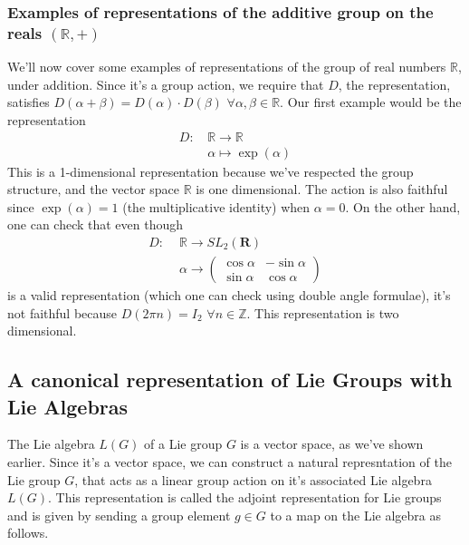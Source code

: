 \documentclass[11pt, oneside]{article}   	%
\theoremstyle{slanted}
\begin{document}
\subsubsection{ Examples of representations of the additive group on the reals $\left( \mathbb{R}, + \right) $} 
We'll now cover some examples of representations of the group of real numbers $\mathbb{R}$, under addition. Since it's a group action, we require that $D$, the representation, satisfies $D( \alpha + \beta ) = D( \alpha) \cdot D( \beta ) \,\, \forall \alpha, \beta \in \mathbb{ R} $.  Our first example would be the representation 
\begin{align*} 
D:\, &  \mathbb{R} \rightarrow \mathbb{ R} \\ 
& \alpha \mapsto \exp ( \alpha )    
\end{align*} 
This is a 1-dimensional representation because we've respected the group structure, and the vector space $\mathbb{ R} $ is one dimensional. The action is also faithful since $\exp (\alpha ) = 1$ (the multiplicative identity) when $\alpha = 0$. On the other hand, one can check that even though
\begin{align*} 
D: \, \, &  \mathbb{ R} \rightarrow SL_2 ( \mathbf{R} ) \\
& \alpha \rightarrow \begin{pmatrix} \cos \alpha & - \sin \alpha \\ 
\sin \alpha & \cos \alpha \end{pmatrix}  
\end{align*} 
is a valid representation (which one can check using double angle formulae), it's not faithful because $D(2 \pi n )  = I_2 \, \,  \forall n \in \mathbb{Z} $. This representation is two dimensional.  


\subsection{A canonical representation of Lie Groups with Lie Algebras}
The Lie algebra $L( G )$ of a Lie group $G $ is a vector space, as we've shown earlier. Since it's a vector space, we can construct a natural represntation of the Lie group $G $, that acts as a linear group action on it's associated Lie algebra $L( G )$. This representation is called the adjoint representation for Lie groups and is given by sending a group element $g \in G$ to a map on the Lie algebra as follows. 
\end{document}
